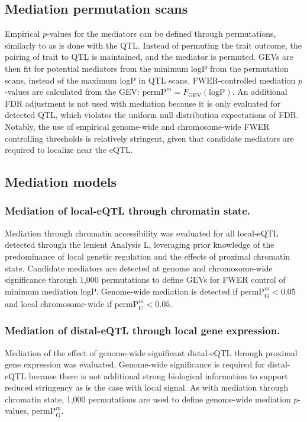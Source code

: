 \documentclass[10pt,letterpaper,twoside]{article}
\newcommand{\permpmed}{\text{permP}^{m}}
\begin{document}
\subsection*{Mediation permutation scans}

Empirical $p$-values for the mediators can be defined through permutations, similarly to as is done with the QTL. Instead of permuting the trait outcome, the pairing of trait to QTL is maintained, and the mediator is permuted. GEVs are then fit for potential mediators from the minimum logP from the permutation scans, instead of the maximum logP in QTL scans. FWER-controlled mediation $p$-values are calculated from the GEV: $\permpmed = F_{\text{GEV}}(\text{logP})$. An additional FDR adjustment is not used with mediation because it is only evaluated for detected QTL, which violates the uniform null distribution expectations of FDR. Notably, the use of empirical genome-wide and chromosome-wide FWER controlling thresholds is relatively stringent, given that candidate mediators are required to localize near the eQTL.

\subsection*{Mediation models}

\subsubsection*{Mediation of local-eQTL through chromatin state.}
Mediation through chromatin accessibility was evaluated for all local-eQTL detected through the lenient Analysis L, leveraging prior knowledge of the predominance of local genetic regulation and the effects of proximal chromatin state. Candidate mediators are detected at genome and chromosome-wide significance through 1,000 permutations to define GEVs for FWER control of minimum mediation logP. Genome-wide mediation is detected if $\permpmed_{\text{G}} < 0.05$ and local chromosome-wide if $\permpmed_{\text{C}} < 0.05$. 

\subsubsection*{Mediation of distal-eQTL through local gene expression.}
Mediation of the effect of genome-wide significant distal-eQTL through proximal gene expression was evaluated. Genome-wide significance is required for distal-eQTL because there is not additional strong biological information to support reduced stringency as is the case with local signal. As with mediation through chromatin state, 1,000 permutations are used to define genome-wide mediation $p$-values, $\permpmed_{\text{G}}$. 
\end{document}
